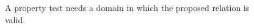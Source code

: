 \begin{figure}[H]
\centering
{}
\caption{A property test needs a domain in which the proposed relation is valid.}\label{fig:teach-M07-08}
\end{figure}
